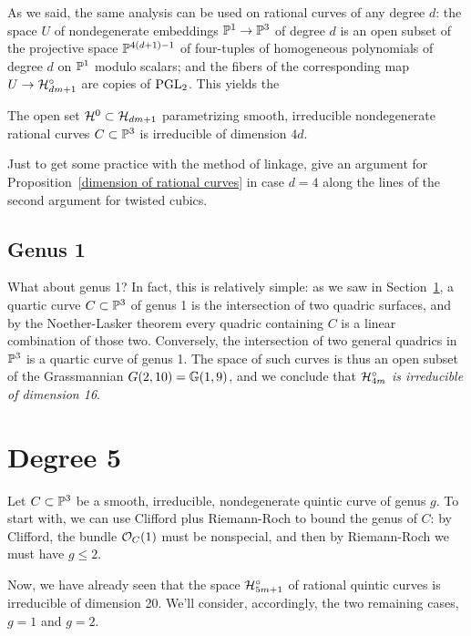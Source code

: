 As we said, the same analysis can be used on rational curves of any degree $d$: the space $U$ of nondegenerate embeddings ${\mathbb P}^1 \to {\mathbb P}^3$ of degree $d$ is an open subset of the projective space ${\mathbb P}^{4(d+1)-1}$ of four-tuples of homogeneous polynomials of degree $d$ on ${\mathbb P}^1$ modulo scalars; and the fibers of the corresponding map $U \to {\cal H}^\circ_{dm+1}$ are copies of $\operatorname{PGL}_2$. This yields the

\begin{proposition}\label{dimension of rational curves}
The open set ${\cal H}^0 \subset {\cal H}_{dm+1}$ parametrizing smooth, irreducible nondegenerate rational curves $C \subset {\mathbb P}^3$ is irreducible of dimension $4d$.
\end{proposition}

\begin{exercise}
Just to get some practice with the method of linkage, give an argument for Proposition~\ref{dimension of rational curves} in case $d=4$ along the lines of the second argument for twisted cubics.
\end{exercise}

\subsection{Genus 1}

What about genus 1? In fact, this is relatively simple: as we saw in Section~\ref{}, a quartic curve $C \subset {\mathbb P}^3$ of genus 1 is the intersection of two quadric surfaces, and by the Noether-Lasker theorem every quadric containing $C$ is a linear combination of those two. Conversely, the intersection of two general quadrics in ${\mathbb P}^3$ is a quartic curve of genus 1. The space of such curves is thus an open subset of the Grassmannian $G(2,10) = {\mathbb G}(1,9)$, and we conclude that \emph{${\cal H}^\circ_{4m}$ is irreducible of dimension 16}.

\section{Degree 5}

Let $C \subset {\mathbb P}^3$ be a smooth, irreducible, nondegenerate quintic curve of genus $g$. To start with, we can use Clifford plus Riemann-Roch to bound the genus of $C$: by Clifford, the bundle ${\mathcal O}_C(1)$ must be nonspecial, and then by Riemann-Roch we must have $g \leq 2$.

Now, we have already seen that the space ${\cal H}^\circ_{5m+1}$ of rational quintic curves is irreducible of dimension 20. We'll consider, accordingly, the two remaining cases, $g=1$ and $g=2$.

